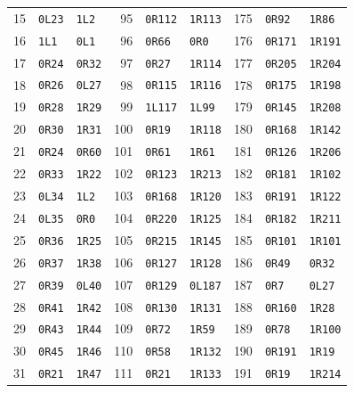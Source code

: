 \begin{longtable}{rll@{\hspace{0.45cm}}rll@{\hspace{0.45cm}}rll}
15 & \texttt{0L23} & \texttt{1L2} & 95 & \texttt{0R112} & \texttt{1R113} & 175 & \texttt{0R92} & \texttt{1R86} \\
16 & \texttt{1L1} & \texttt{0L1} & 96 & \texttt{0R66} & \texttt{0R0} & 176 & \texttt{0R171} & \texttt{1R191} \\
17 & \texttt{0R24} & \texttt{0R32} & 97 & \texttt{0R27} & \texttt{1R114} & 177 & \texttt{0R205} & \texttt{1R204} \\
18 & \texttt{0R26} & \texttt{0L27} & 98 & \texttt{0R115} & \texttt{1R116} & 178 & \texttt{0R175} & \texttt{1R198} \\
19 & \texttt{0R28} & \texttt{1R29} & 99 & \texttt{1L117} & \texttt{1L99} & 179 & \texttt{0R145} & \texttt{1R208} \\
20 & \texttt{0R30} & \texttt{1R31} & 100 & \texttt{0R19} & \texttt{1R118} & 180 & \texttt{0R168} & \texttt{1R142} \\
21 & \texttt{0R24} & \texttt{0R60} & 101 & \texttt{0R61} & \texttt{1R61} & 181 & \texttt{0R126} & \texttt{1R206} \\
22 & \texttt{0R33} & \texttt{1R22} & 102 & \texttt{0R123} & \texttt{1R213} & 182 & \texttt{0R181} & \texttt{1R102} \\
23 & \texttt{0L34} & \texttt{1L2} & 103 & \texttt{0R168} & \texttt{1R120} & 183 & \texttt{0R191} & \texttt{1R122} \\
24 & \texttt{0L35} & \texttt{0R0} & 104 & \texttt{0R220} & \texttt{1R125} & 184 & \texttt{0R182} & \texttt{1R211} \\
25 & \texttt{0R36} & \texttt{1R25} & 105 & \texttt{0R215} & \texttt{1R145} & 185 & \texttt{0R101} & \texttt{1R101} \\
26 & \texttt{0R37} & \texttt{1R38} & 106 & \texttt{0R127} & \texttt{1R128} & 186 & \texttt{0R49} & \texttt{0R32} \\
27 & \texttt{0R39} & \texttt{0L40} & 107 & \texttt{0R129} & \texttt{0L187} & 187 & \texttt{0R7} & \texttt{0L27} \\
28 & \texttt{0R41} & \texttt{1R42} & 108 & \texttt{0R130} & \texttt{1R131} & 188 & \texttt{0R160} & \texttt{1R28} \\
29 & \texttt{0R43} & \texttt{1R44} & 109 & \texttt{0R72} & \texttt{1R59} & 189 & \texttt{0R78} & \texttt{1R100} \\
30 & \texttt{0R45} & \texttt{1R46} & 110 & \texttt{0R58} & \texttt{1R132} & 190 & \texttt{0R191} & \texttt{1R19} \\
31 & \texttt{0R21} & \texttt{1R47} & 111 & \texttt{0R21} & \texttt{1R133} & 191 & \texttt{0R19} & \texttt{1R214} \\

\end{longtable}
